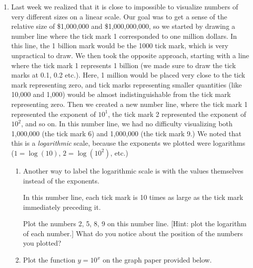 \documentclass[12pt,dvipsnames]{article}
\begin{document}

\begin{enumerate}[label= {\bf  \arabic*:}]
\item Last week we realized that it is close to impossible to visualize numbers of very different sizes on a linear scale. Our goal was to get a sense of the relative size of \$1,000,000 and \$1,000,000,000, so we started by drawing a number line where the tick mark 1 corresponded to one million dollars. In this line, the 1 billion mark would be the 1000 tick mark, which is very unpractical to draw. We then took the opposite approach, starting with a line where the tick mark 1 represents 1 billion (we made sure to draw the tick marks at 0.1, 0.2 etc.). Here, 1 million would be placed very close to the tick mark representing zero, and tick marks representing smaller quantities (like 10,000 and 1,000) would be almost indistinguishable from the tick mark representing zero. Then we created a new number line, where the tick mark 1 represented the exponent of $\displaystyle 10^1$, the tick mark 2 represented the exponent of $\displaystyle 10^2$, and so on. In this number line, we had no difficulty visualizing both 1,000,000 (the tick mark 6) and 1,000,000 (the tick mark 9.) We noted that this is a \emph{logarithmic} scale, because the exponents we plotted were logarithms ($\displaystyle 1=\log(10)$, $2=\log\left( 10^2\right)$, etc.)

\begin{enumerate}
	\item  Another way to label the logarithmic scale is with the values themselves instead of the exponents. 
	
	
	In this number line, each tick mark is 10 times as large as the tick mark immediately preceding it. 
	
	Plot the numbers 2, 5, 8, 9 on this number line. [Hint: plot the logarithm of each number.] What do you notice about the position of the numbers you plotted? 
\item Plot the function $\displaystyle y=10^x$ on the graph paper provided below.


\end{enumerate}
\end{enumerate}
\end{document}
